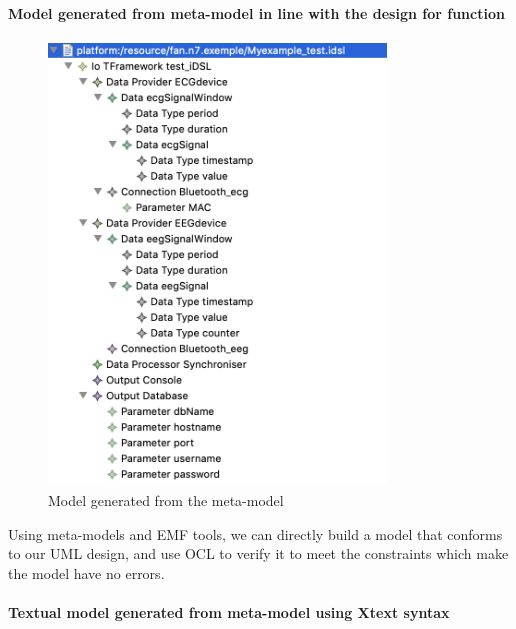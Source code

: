 \documentclass{article}
\begin{document}
\paragraph{Model generated from meta-model in line with the design for function} 

\paragraph{}

\begin{figure}[htbp] 
\centering 
\includegraphics[width=0.8\textwidth]{Model generated from the meta-model.png} 
\caption{Model generated from the meta-model} 
\label{Fig.main5} 
\end{figure}

Using meta-models and EMF tools, we can directly build a model that conforms to our UML design, and use OCL to verify it to meet the constraints which make the model have no errors.

\paragraph{Textual model generated from meta-model using Xtext syntax} 

\paragraph{}
\end{document}
